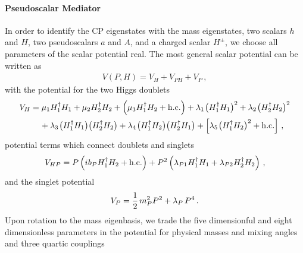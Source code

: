 \paragraph{Pseudoscalar Mediator} 
In order to identify the CP eigenstates with the mass eigenstates, two scalars $h$ and $H$, two pseudoscalars $a$ and $A$, and a charged scalar $H^\pm$, we choose all parameters of the scalar potential real. The most general scalar potential can be written as 
\begin{align}\label{eq:fullPot}
V(P,H)=V_H+V_{PH}+V_P\,,
\end{align}
with the potential for the two Higgs doublets
\begin{align}\label{eq:VH}
V_{H} & = \mu_1 H_1^\dagger H_1 + \mu_2 H_2^\dagger H_2 + \left ( \mu_3  H_1^\dagger H_2 + {\rm h.c.} \right ) + \lambda_1  \hspace{0.25mm} \big ( H_1^\dagger H_1  \big )^2  + \lambda_2  \hspace{0.25mm} \big ( H_2^\dagger H_2 \big  )^2 \notag \\
& \phantom{xx} +  \lambda_3 \hspace{0.25mm} \big ( H_1^\dagger H_1  \big ) \big ( H_2^\dagger H_2  \big ) + \lambda_4  \hspace{0.25mm} \big ( H_1^\dagger H_2  \big ) \big ( H_2^\dagger H_1  \big ) + \left [ \lambda_5   \hspace{0.25mm} \big ( H_1^\dagger H_2 \big )^2 + {\rm h.c.} \right ]  \,,
\end{align}
potential terms which connect doublets and singlets 
\begin{equation} \label{eq:VHP}
\begin{split}
V_{HP}  = P \left ( i \hspace{0.1mm} b_P  \hspace{0.1mm}  H_1^\dagger H_2 + {\rm h.c.} \right ) + P^2 \left (  \lambda_{P1}  \hspace{0.1mm}  H_1^\dagger H_1 +   \lambda_{P2}  \hspace{0.1mm}  H_2^\dagger H_2 \right )  \,,
\end{split} 
\end{equation}
and the singlet potential
\begin{equation} \label{eq:VP}
V_{P}  =  \frac{1}{2} \hspace{0.5mm} m_P^2  P^2 +  \lambda_P\,P^4 \,.
\end{equation}
Upon rotation to the mass eigenbasis, we trade the five dimensionful and eight dimensionless parameters in the potential  for physical masses and mixing angles and three quartic couplings
